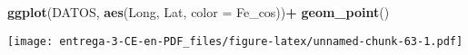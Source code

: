 \documentclass[
]{article}
\newenvironment{Shaded}{\begin{snugshade}}{\end{snugshade}}
\newcommand{\DataTypeTok}[1]{\textcolor[rgb]{0.13,0.29,0.53}{#1}}
\newcommand{\DecValTok}[1]{\textcolor[rgb]{0.00,0.00,0.81}{#1}}
\newcommand{\KeywordTok}[1]{\textcolor[rgb]{0.13,0.29,0.53}{\textbf{#1}}}
\newcommand{\NormalTok}[1]{#1}
\newcommand{\OperatorTok}[1]{\textcolor[rgb]{0.81,0.36,0.00}{\textbf{#1}}}
\newcommand{\StringTok}[1]{\textcolor[rgb]{0.31,0.60,0.02}{#1}}
\begin{document}
\begin{Shaded}
\begin{Highlighting}[]
\KeywordTok{ggplot}\NormalTok{(DATOS, }\KeywordTok{aes}\NormalTok{(Long, Lat, }\DataTypeTok{color =}\NormalTok{ Fe_cos))}\OperatorTok{+}
\StringTok{  }\KeywordTok{geom_point}\NormalTok{()}
\end{Highlighting}
\end{Shaded}

\texttt{[image: entrega-3-CE-en-PDF\_files/figure-latex/unnamed-chunk-63-1.pdf]}

\begin{Shaded}
\end{Shaded}
\end{document}
